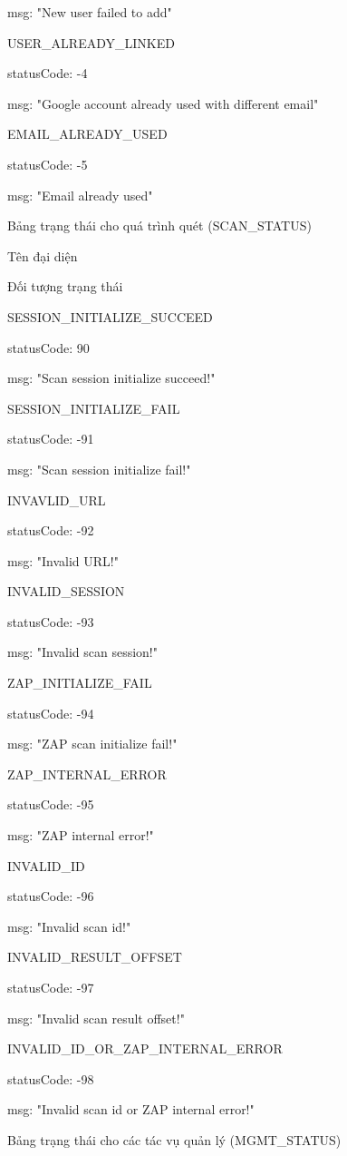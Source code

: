 msg: "New user failed to add"

USER\_ALREADY\_LINKED

statusCode: -4

msg: "Google account already used with different email"

EMAIL\_ALREADY\_USED

statusCode: -5

msg: "Email already used"

 

Bảng trạng thái cho quá trình quét (SCAN\_STATUS)

Tên đại diện

Đối tượng trạng thái

SESSION\_INITIALIZE\_SUCCEED

statusCode: 90

msg: "Scan session initialize succeed!"

SESSION\_INITIALIZE\_FAIL

statusCode: -91

msg: "Scan session initialize fail!"

INVAVLID\_URL

statusCode: -92

msg: "Invalid URL!"

INVALID\_SESSION

statusCode: -93

msg: "Invalid scan session!"

ZAP\_INITIALIZE\_FAIL

statusCode: -94

msg: "ZAP scan initialize fail!"

ZAP\_INTERNAL\_ERROR

statusCode: -95

msg: "ZAP internal error!"

INVALID\_ID

statusCode: -96

msg: "Invalid scan id!"

INVALID\_RESULT\_OFFSET

statusCode: -97

msg: "Invalid scan result offset!"

INVALID\_ID\_OR\_ZAP\_INTERNAL\_ERROR

statusCode: -98

msg: "Invalid scan id or ZAP internal error!"

 

Bảng trạng thái cho các tác vụ quản lý (MGMT\_STATUS)

